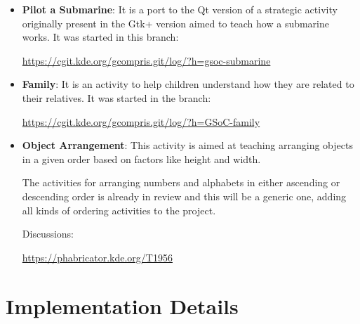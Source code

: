 \documentclass[preprint,12pt]{elsarticle}
\begin{document}
\begin{itemize}

\item \textbf{Pilot a Submarine}: It is a port to the Qt version of a strategic activity originally present in the Gtk+ version aimed to teach how a submarine works. It was started in this branch: 

\href{https://cgit.kde.org/gcompris.git/log/?h=gsoc-submarine}{https://cgit.kde.org/gcompris.git/log/?h=gsoc-submarine}

\item \textbf{Family}: It is an activity to help children understand how they are related to their relatives. It was started in the branch:

\href{https://cgit.kde.org/gcompris.git/log/?h=GSoC-family}{https://cgit.kde.org/gcompris.git/log/?h=GSoC-family}






\item \textbf{Object Arrangement}: This activity is aimed at teaching arranging objects in a given order based on factors like height and width.

The activities for arranging numbers and alphabets in either ascending or descending order is already in review and this will be a generic one, adding all kinds of ordering activities to the project.

Discussions:

\href{https://phabricator.kde.org/T1956}{https://phabricator.kde.org/T1956}
\end{itemize}

\section{Implementation Details}
\label{S:1}
\end{document}
